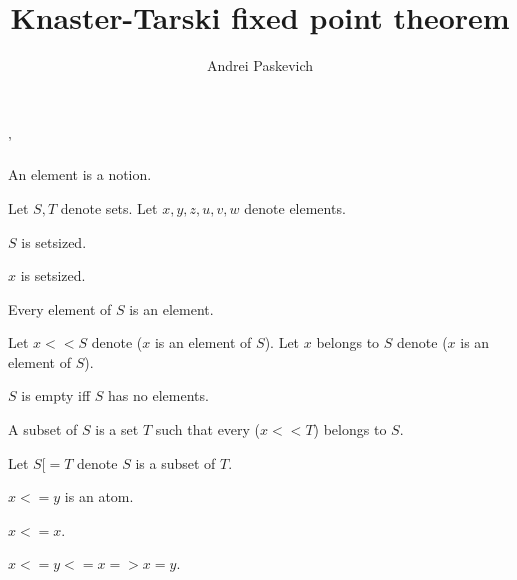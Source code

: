 \documentclass{document}
\title{Knaster-Tarski fixed point theorem}
\author{Andrei Paskevich}
\date{}
\begin{document}
'

  \maketitle

  \begin{forthel}

    \begin{signature}
      An element is a notion.
    \end{signature}

    Let $S,T$ denote sets.
    Let $x,y,z,u,v,w$ denote elements.

    \begin{axiom}
      $S$ is setsized.
    \end{axiom}
    
    \begin{axiom}
      $x$ is setsized.
    \end{axiom}

    \begin{axiom}
      Every element of $S$ is an element.
    \end{axiom}

    Let $x << S$ denote ($x$ is an element of $S$).
    Let $x$ belongs to $S$ denote ($x$ is an element of $S$).

    \begin{definition}[DefEmpty]
      $S$ is empty iff $S$ has no elements.
    \end{definition}

    \begin{definition}[DefSub]
      A subset of $S$ is a set $T$ such that every ($x << T$) belongs to $S$.
    \end{definition}

    Let $S [= T$ denote $S$ is a subset of $T$.

    \begin{signature}[LessRel]
      $x <= y$ is an atom.
    \end{signature}

    \begin{axiom}[ARefl]
      $x <= x$.
    \end{axiom}

    \begin{axiom}[ASymm]
      $x <= y <= x => x = y$.
    \end{axiom}


\end{forthel}
\end{document}
